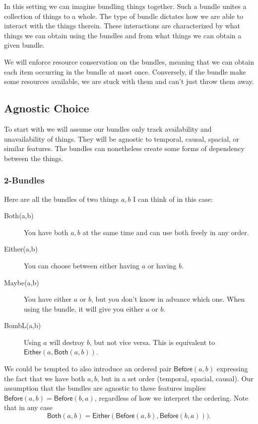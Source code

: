 \documentclass[12pt]{article}
\theoremstyle{definition}
\theoremstyle{plain}
\theoremstyle{plain}
\theoremstyle{plain}
\theoremstyle{plain}
\theoremstyle{remark}
\theoremstyle{remark}
\begin{document}
In this setting we can imagine bundling things together. Such a bundle unites a collection of things to a whole. The type of bundle dictates how we are able to interact with the things therein. These interactions are characterized by what things we can obtain using the bundles and from what things we can obtain a given bundle.

We will enforce resource conservation on the bundles, meaning that we can obtain each item occurring in the bundle at most once. Conversely, if the bundle make some resources available, we are stuck with them and can't just throw them away.

\subsection{Agnostic Choice}
To start with we will assume our bundles only track availability and unavailability of things. They will be agnostic to temporal, causal, spacial, or similar features. The bundles can nonetheless create some forms of dependency between the things. 

\subsubsection{2-Bundles}
Here are all the bundles of two things $a,b$ I can think of in this case:
\begin{description}
	\item[Both(a,b)] You have both $a,b$ at the same time and can use both freely in any order.
	\item[Either(a,b)] You can choose between either having $a$ or having $b$.
	\item[Maybe(a,b)] You have either $a$ or $b$, but you don't know in advance which one. When using the bundle, it will give you either $a$ or $b$.
	\item[BombL(a,b)] Using $a$ will destroy $b$, but not vice versa. This is equivalent to $\mathsf{Either}(a,\mathsf{Both}(a,b))$.
\end{description}

We could be tempted to also introduce an ordered pair $\mathsf{Before}(a,b)$ expressing the fact that we have both $a,b$, but in a set order (temporal, spacial, causal). Our assumption that the bundles are agnostic to these features implies $\mathsf{Before}(a,b) = \mathsf{Before}(b,a)$, regardless of how we interpret the ordering. Note that in any case \[\mathsf{Both}(a,b) = \mathsf{Either}(\mathsf{Before}(a,b), \mathsf{Before}(b,a))). \]
\end{document}
